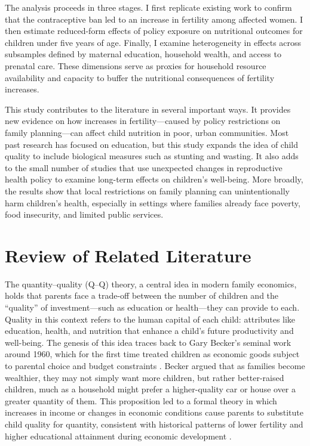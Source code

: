 \documentclass[]{AEA}
\begin{document}
The analysis proceeds in three stages. I first replicate existing work
\citep{dumas2019sex} to confirm that the contraceptive ban led to an
increase in fertility among affected women. I then estimate reduced-form
effects of policy exposure on nutritional outcomes for children under
five years of age. Finally, I examine heterogeneity in effects across
subsamples defined by maternal education, household wealth, and access
to prenatal care. These dimensions serve as proxies for household
resource availability and capacity to buffer the nutritional
consequences of fertility increases.

This study contributes to the literature in several important ways. It
provides new evidence on how increases in fertility---caused by policy
restrictions on family planning---can affect child nutrition in poor,
urban communities. Most past research has focused on education, but this
study expands the idea of child quality to include biological measures
such as stunting and wasting. It also adds to the small number of
studies that use unexpected changes in reproductive health policy to
examine long-term effects on children's well-being. More broadly, the
results show that local restrictions on family planning can
unintentionally harm children's health, especially in settings where
families already face poverty, food insecurity, and limited public
services.

\section{Review of Related Literature}

The quantity--quality (Q--Q) theory, a central idea in modern family
economics, holds that parents face a trade-off between the number of
children and the ``quality'' of investment---such as education or
health---they can provide to each. Quality in this context refers to the
human capital of each child: attributes like education, health, and
nutrition that enhance a child's future productivity and well-being. The
genesis of this idea traces back to Gary Becker's seminal work around
1960, which for the first time treated children as economic goods
subject to parental choice and budget constraints
\citep{becker1960economic}. Becker argued that as families become
wealthier, they may not simply want more children, but rather
better-raised children, much as a household might prefer a
higher-quality car or house over a greater quantity of them. This
proposition led to a formal theory in which increases in income or
changes in economic conditions cause parents to substitute child quality
for quantity, consistent with historical patterns of lower fertility and
higher educational attainment during economic development
\citep{galor2000population}.
\end{document}
